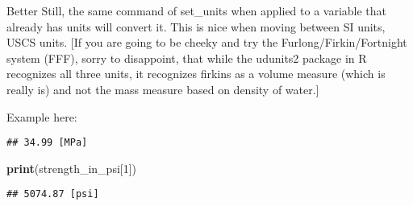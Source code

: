 \documentclass[]{article}
\newenvironment{Shaded}{\begin{snugshade}}{\end{snugshade}}
\newcommand{\CommentTok}[1]{\textcolor[rgb]{0.56,0.35,0.01}{\textit{#1}}}
\newcommand{\DataTypeTok}[1]{\textcolor[rgb]{0.13,0.29,0.53}{#1}}
\newcommand{\DecValTok}[1]{\textcolor[rgb]{0.00,0.00,0.81}{#1}}
\newcommand{\KeywordTok}[1]{\textcolor[rgb]{0.13,0.29,0.53}{\textbf{#1}}}
\newcommand{\NormalTok}[1]{#1}
\newcommand{\OperatorTok}[1]{\textcolor[rgb]{0.81,0.36,0.00}{\textbf{#1}}}
\newcommand{\StringTok}[1]{\textcolor[rgb]{0.31,0.60,0.02}{#1}}
\begin{document}
Better Still, the same command of set\_units when applied to a variable
that already has units will convert it. This is nice when moving between
SI units, USCS units. {[}If you are going to be cheeky and try the
Furlong/Firkin/Fortnight system (FFF), sorry to disappoint, that while
the udunits2 package in R recognizes all three units, it recognizes
firkins as a volume measure (which is really is) and not the mass
measure based on density of water.{]}

Example here:

\begin{Shaded}
\end{Shaded}

\begin{verbatim}
## 34.99 [MPa]
\end{verbatim}

\begin{Shaded}
\begin{Highlighting}[]
  \KeywordTok{print}\NormalTok{(strength_in_psi[}\DecValTok{1}\NormalTok{])}
\end{Highlighting}
\end{Shaded}

\begin{verbatim}
## 5074.87 [psi]
\end{verbatim}

\begin{Shaded}
\end{Shaded}
\end{document}
